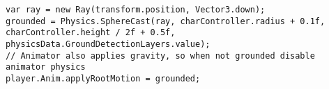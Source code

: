 \begin{lstlisting}[caption={Implementation of grounded state detection.},label={lst:grounded-detection}]
var ray = new Ray(transform.position, Vector3.down);
grounded = Physics.SphereCast(ray, charController.radius + 0.1f, charController.height / 2f + 0.5f, physicsData.GroundDetectionLayers.value);
// Animator also applies gravity, so when not grounded disable animator physics
player.Anim.applyRootMotion = grounded;
\end{lstlisting}